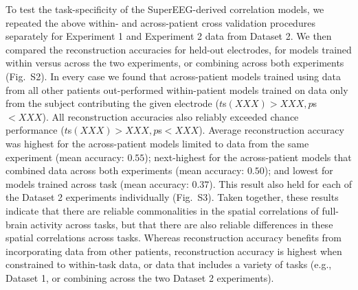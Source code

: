 \documentclass[11pt]{article}
\newcommand{\perexptaskrecon}{S2}
\newcommand{\perexptaskreconseparated}{S3}
\begin{document}
To test the task-specificity of the SuperEEG-derived correlation
models, we repeated the above within- and across-patient cross validation
procedures separately for Experiment 1 and Experiment 2 data from
Dataset 2.  We then compared the reconstruction accuracies for held-out
electrodes, for models trained within versus across the two
experiments, or combining across both experiments
(Fig.~\perexptaskrecon).  In every case we found that across-patient
models trained using data from all other patients out-performed
within-patient models trained on data only from the subject
contributing the given electrode ($t$s$(XXX) > XXX, p$s$ < XXX$).  All
reconstruction accuracies also reliably exceeded chance performance
($t$s$(XXX) > XXX, p$s$ < XXX$).  Average reconstruction accuracy was
highest for the across-patient models limited to data from the same
experiment (mean accuracy: $0.55$); next-highest for the
across-patient models that combined data across both experiments (mean
accuracy: $0.50$); and lowest for models trained across task (mean
accuracy: $0.37$).  This result also held for each of the Dataset 2
experiments individually (Fig.~\perexptaskreconseparated).  Taken
together, these results indicate that there are reliable commonalities
in the spatial correlations of full-brain activity across tasks, but
that there are also reliable differences in these spatial correlations
across tasks.  Whereas reconstruction accuracy benefits from
incorporating data from other patients, reconstruction accuracy is
highest when constrained to within-task data, or data that includes a
variety of tasks (e.g., Dataset 1, or combining across the two Dataset
2 experiments).
\end{document}
